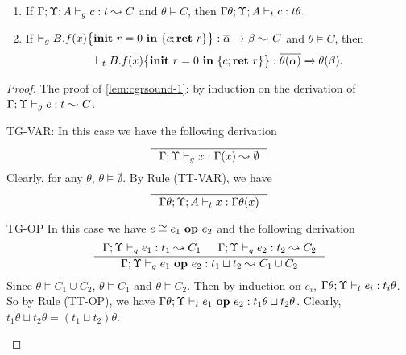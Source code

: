 {{{\begin{lemma}
\begin{enumerate}[label={(\alph*)}]
\item\label{lem:cgrsound-2} If $\Gamma;\Upsilon; A \vdash_{g} c : t\leadsto C$ and $\theta \vDash C$,
then  $\Gamma\theta;\Upsilon;A \vdash_{t} c : t\theta.$

\item\label{lem:cgrsound-3} If $ \vdash_{g} {B.f}(x)\big\{{{\textbf{init}~ {r}=0 ~\textbf{in}~\{{c};\textbf{ret}~{r}\}}}\big\} :  \overline{\alpha}\rightarrow \beta\leadsto C$ and $\theta \vDash C$, then
\[
\vdash_{t} {B.f}(x)\big\{{{\textbf{init}~ {r}=0 ~\textbf{in}~\{{c};\textbf{ret}~{r}\}}}\big\} : \overline{\theta(\alpha)}\xrightarrow{}\theta(\beta).
\]

\end{enumerate}
\end{lemma}

\begin{proof}
The proof of \ref{lem:cgrsound-1}: by induction on the derivation of $\Gamma;\Upsilon \vdash_{g} e : t\leadsto C$. %
\begin{ProofEnumDesc}
\item[TG-VAR:] In this case we have the following derivation
\begin{equation*}
\inference{}
{\Gamma;\trace\vdash_{g} x : \Gamma(x)\leadsto \emptyset}
\end{equation*}
Clearly, for any $\theta$, $\theta \vDash \emptyset$.
By Rule {(TT-VAR)}, we have
\begin{equation*}
\inference{}
{\Gamma\theta;\trace; A \vdash_{t} \leVAR{x} : \Gamma\theta(x)}
\end{equation*}

\item[TG-OP] In this case we have $e \cong {e_1}~\textbf{op}~{e_2}$ and the following derivation
\begin{equation*}
\inference
{\Gamma;\trace \vdash_{g} e_1: t_1 \leadsto C_1 &
 \Gamma;\trace \vdash_{g} e_2: t_2 \leadsto C_2}
{\Gamma;\trace \vdash_{g} \leOP{e_1}{e_2} : t_1\sqcup t_2\leadsto C_1\cup C_2}
\end{equation*}
Since $\theta \vDash C_1\cup C_2$, $\theta\vDash C_1$ and $\theta\vDash C_2$.
Then by induction on $e_i$, $\Gamma\theta;\Upsilon \vdash_{t} e_i: t_i\theta$.
So by Rule {(TT-OP)}, we have $\Gamma\theta;\Upsilon \vdash_{t} {e_1}~\textbf{op}~{e_2}: t_1\theta\sqcup t_2\theta $.
Clearly, $t_1\theta\sqcup t_2\theta = (t_1\sqcup t_2)\theta$.
\end{ProofEnumDesc}


\end{proof}}}}
